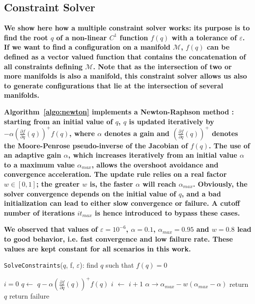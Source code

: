 \documentclass{article}
\newcommand\manifold{\mathcal{M}}
\begin{document}
\subsection{Constraint Solver}
\label{sec:SolveConstraints}

\textbf{We show here how a multiple constraint solver works: its
  purpose is to find the root $q$ of a non-linear $C^1$ function
  $f(q)$ with a tolerance of $\varepsilon$. If we want to find a
  configuration on a manifold $\manifold$, $f(q)$ can be defined as a
  vector valued function that contains the concatenation of all
  constraints defining $\manifold$. Note that as the intersection of
  two or more manifolds is also a manifold, this constraint solver
  allows us also to generate configurations that lie at the
  intersection of several manifolds.}

\textbf{Algorithm~\ref{algo:newton} implements a Newton-Raphson method
  \cite{bonnans2006numerical}: starting from an initial value of $q$,
  $q$ is updated iteratively by $- \alpha \left(\frac{\partial
    f}{\partial q}(q)\right)^{+} f(q)$, where $\alpha$ denotes a gain
  and $\left(\frac{\partial f}{\partial q}(q)\right)^{+}$ denotes the
  Moore-Penrose pseudo-inverse of the Jacobian of $f(q)$. The use of
  an adaptive gain $\alpha$, which increases iteratively from an
  initial value $\alpha$ to a maximum value $\alpha_{max}$, allows the
  overshoot avoidance and convergence acceleration. The update rule
  relies on a real factor $w \in [0,1]$; the greater $w$ is, the
  faster $\alpha$ will reach $\alpha_{max}$. Obviously, the solver
  convergence depends on the initial value of $q$, and a bad
  initialization can lead to either slow convergence or failure. A
  cutoff number of iterations $it_{max}$ is hence introduced to bypass
  these cases.}

\textbf{We observed that values of $\varepsilon=10^{-6}$,
  $\alpha=0.1$, $\alpha_{max}=0.95$ and $w=0.8$ lead to good behavior,
  i.e. fast convergence and low failure rate. These values are kept
  constant for all scenarios in this work.}

\begin{algorithm}
\caption{\texttt{SolveConstraints}($q$, f, $\varepsilon$): find $q$
  such that $f(q) = 0$}
\label{algo:newton}
\begin{algorithmic}
\STATE $i=0$
\STATE $q \leftarrow$ $q - \alpha \left(\frac{\partial f}{\partial q}(q)\right)^{+} f(q)$
\STATE $i$ $\leftarrow$ $i+1$
\STATE $\alpha \rightarrow \alpha_{max} - w(\alpha_{max} - \alpha)$
\ENDWHILE
{}
\STATE return $q$
\ELSE
\STATE return failure
\ENDIF
\end{algorithmic}
\end{algorithm}
\end{document}
